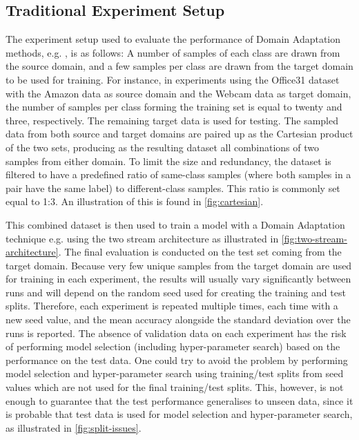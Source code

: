 \documentclass[journal]{IEEEtran}
\begin{document}
\subsection{Traditional Experiment Setup}\label{sec:traditional-experimental-setup}
The experiment setup used to evaluate the performance of Domain Adaptation methods, e.g. \cite{motiian2017ccsa,xu2019dsne}, is as follows: A number of samples of each class are drawn from the source domain, and a few samples per class are drawn from the target domain to be used for training. For instance, in experiments using the Office31 dataset~\cite{saenko2010adapting} with the Amazon data as source domain and the Webcam data as target domain, the number of samples per class forming the training set is equal to twenty and three, respectively. The remaining target data is used for testing.
The sampled data from both source and target domains are paired up as the Cartesian product of the two sets, producing as the resulting dataset all combinations of two samples from either domain. To limit the size and redundancy, the dataset is filtered to have a predefined ratio of same-class samples (where both samples in a pair have the same label) to different-class samples. This ratio is commonly set equal to 1:3. An illustration of this is found in \cref{fig:cartesian}.


This combined dataset is then used to train a model with a Domain Adaptation technique e.g. using the two stream architecture as illustrated in \cref{fig:two-stream-architecture}. The final evaluation is conducted on the test set coming from the target domain. 
Because very few unique samples from the target domain are used for training in each experiment, the results will usually vary significantly between runs and will depend on the random seed used for creating the training and test splits. Therefore, each experiment is repeated multiple times, each time with a new seed value, and the mean accuracy alongside the standard deviation over the runs is reported. The absence of validation data on each experiment has the risk of performing model selection (including hyper-parameter search) based on the performance on the test data. 
One could try to avoid the problem by performing model selection and hyper-parameter search using training/test splits from seed values which are not used for the final training/test splits. This, however, is not enough to guarantee that the test performance generalises to unseen data, since it is probable that test data is used for model selection and hyper-parameter search, as illustrated in \cref{fig:split-issues}. 
\end{document}

